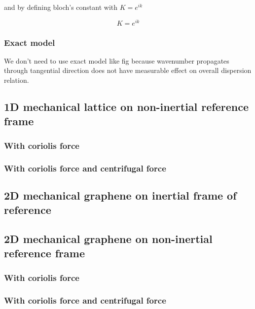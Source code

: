 \documentclass[../main.tex]{subfiles}
\begin{document}
and by defining bloch's constant with $K = e^{ik}$

$$
K = e^{ik}
$$


\subsubsection{Exact model}

We don't need to use exact model like fig because wavenumber propagates
through tangential direction does not have measurable effect on
overall dispersion relation.

\subsection{1D mechanical lattice on non-inertial reference frame}

\subsubsection{With coriolis force}

\subsubsection{With coriolis force and centrifugal force}

\subsection{2D mechanical graphene on inertial frame of reference}

\subsection{2D mechanical graphene on non-inertial reference frame}

\subsubsection{With coriolis force}

\subsubsection{With coriolis force and centrifugal force}
\end{document}
